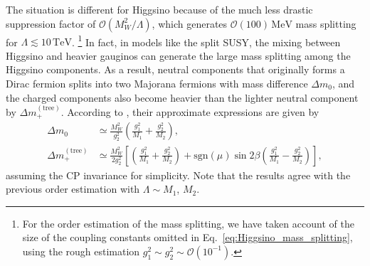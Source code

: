 \documentclass[12pt,twoside,book]{article}
\begin{document}
The situation is different for Higgsino because of the much less drastic suppression factor of $\mathcal{O} (M_W^2 / \Lambda)$, which generates $\mathcal{O} (100)\,\mathrm{MeV}$ mass splitting for $\Lambda \lesssim \mathrm{10}\,\mathrm{TeV}$.
\footnote{
  For the order estimation of the mass splitting, we have taken account of the size of the coupling constants omitted in Eq.~\eqref{eq:Higgsino_mass_splitting}, using the rough estimation $g_1^2 \sim g_2^2 \sim \mathcal{O} (10^{-1})$.
}
In fact, in models like the split SUSY, the mixing between Higgsino and heavier gauginos can generate the large mass splitting among the Higgsino components.
As a result, neutral components that originally forms a Dirac fermion splits into two Majorana fermions with mass difference $\Delta m_0$, and the charged components also become heavier than the lighter neutral component by $\Delta m_{+}^{\mathrm{(tree)}}$.
According to \cite{Fukuda:2017jmk}, their approximate expressions are given by
\begin{align}
  \Delta m_0 &\simeq \frac{M_W^2}{g_2^2} \left( \frac{g_1^2}{M_1} + \frac{g_2^2}{M_2} \right),\\
  \Delta m_{+}^{\mathrm{(tree)}} &\simeq \frac{M_W^2}{2 g_2^2} \left[
  \left( \frac{g_1^2}{M_1} + \frac{g_2^2}{M_2} \right)
  + \mathrm{sgn} (\mu) \sin 2\beta \left( \frac{g_1^2}{M_1} - \frac{g_2^2}{M_2} \right) \right],
  \label{eq:Higgsino_delm_tree}
\end{align}
assuming the CP invariance for simplicity.
Note that the results agree with the previous order estimation with $\Lambda \sim M_1$, $M_2$.
\end{document}
